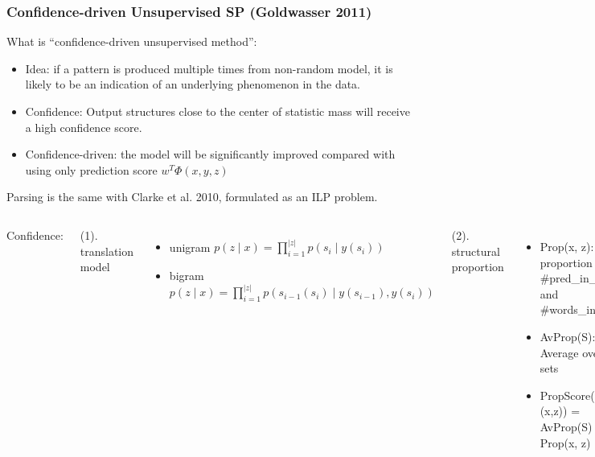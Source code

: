 \documentclass{beamer}
\begin{document}
\begin{frame}
    \frametitle{Confidence-driven Unsupervised SP (Goldwasser 2011)}
     {
        What is ``confidence-driven unsupervised method'':
        \begin{itemize}
            \item Idea: if a pattern is produced multiple times from non-random model,
                it is likely to be an indication of an underlying phenomenon in the data.

            \item Confidence: Output structures close to the center of statistic mass
                will receive a high confidence score.

            \item Confidence-driven: the model will be significantly improved
                compared with using only prediction score $w^T\Phi(x,y,z)$
        \end{itemize}

        Parsing is the same with Clarke et al. 2010, formulated as an ILP problem.
    }

     {
        \begin{columns}
            Confidence:

            (1). translation model
            \begin{itemize}

                \item unigram $p(z\mid x)=\prod_{i=1}^{\vert z\vert} p(s_i\mid y(s_i))$
                \item bigram $p(z\mid x)=\prod_{i=1}^{\vert z\vert}
                    p(s_{i-1}(s_i)\mid y(s_{i-1}),y(s_i))$
            \end{itemize}
            (2). structural proportion
            \begin{itemize}
                \item Prop(x, z): proportion of \#pred\_in\_z and \#words\_in\_x
                \item AvProp(S): Average over sets
                \item PropScore(S, (x,z)) = AvProp(S) - Prop(x, z)
            \end{itemize}

            combined: use (2) to filter candidates and (1) to rank items


\end{columns}}
\end{frame}
\end{document}
